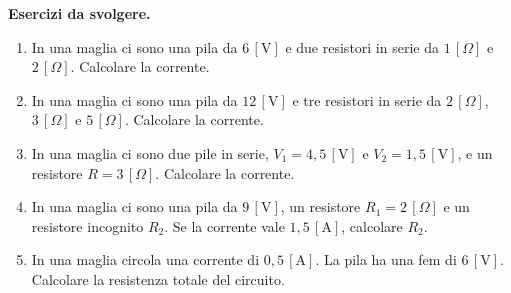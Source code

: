 \textbf{Esercizi da svolgere.}

\begin{enumerate}[leftmargin=1cm]
  \item In una maglia ci sono una pila da \(6\,[\text{V}]\) e due resistori in serie da \(1\,[\Omega]\) e \(2\,[\Omega]\). Calcolare la corrente.
  \item In una maglia ci sono una pila da \(12\,[\text{V}]\) e tre resistori in serie da \(2\,[\Omega]\), \(3\,[\Omega]\) e \(5\,[\Omega]\). Calcolare la corrente.
  \item In una maglia ci sono due pile in serie, \(V_1 = 4{,}5\,[\text{V}]\) e \(V_2 = 1{,}5\,[\text{V}]\), e un resistore \(R = 3\,[\Omega]\). Calcolare la corrente.
  \item In una maglia ci sono una pila da \(9\,[\text{V}]\), un resistore \(R_1 = 2\,[\Omega]\) e un resistore incognito \(R_2\). Se la corrente vale \(1{,}5\,[\text{A}]\), calcolare \(R_2\).
  \item In una maglia circola una corrente di \(0{,}5\,[\text{A}]\). La pila ha una fem di \(6\,[\text{V}]\). Calcolare la resistenza totale del circuito.
\end{enumerate}
